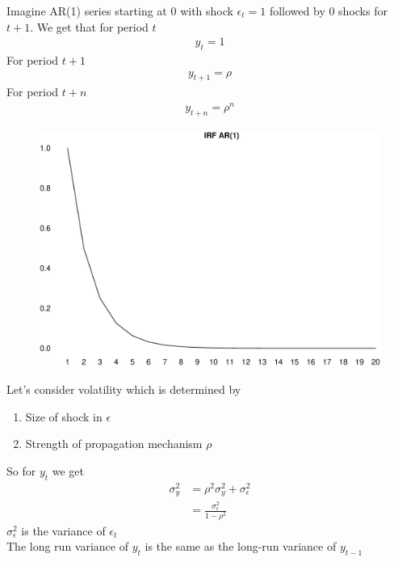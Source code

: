 \documentclass{beamer}
\begin{document}
\begin{frame}
  Imagine AR(1) series starting at 0 with shock $\epsilon_t = 1$ followed by 0 shocks for $t+1$.
  We get that for period $t$
  \begin{align}
    y_t = 1
  \end{align}
  \medskip
  For period $t+1$
  \begin{align}
    y_{t+1} = \rho
  \end{align}
  \medskip 
  For period $t+n$
  \begin{align}
    y_{t+n} = \rho^n
  \end{align}
\end{frame}

\begin{frame}
  \begin{figure}
    \includegraphics[scale=.3]{irf_ar1.eps}
  \end{figure}
\end{frame}


\begin{frame}
  Let's consider volatility which is determined by
  \begin{enumerate}
    \item Size of shock in $\epsilon$
    \item Strength of propagation mechanism $\rho$
  \end{enumerate}
  \medskip
  So for $y_t$ we get 
  \begin{align}
  \sigma_y^2 &= \rho^2 \sigma_y^2 + \sigma_\epsilon^2\\ \nonumber
  &= \frac{\sigma_\epsilon^2}{1-\rho^2}
\end{align}
\medskip
$\sigma_\epsilon^2$ is the variance of $\epsilon_t$\\
The long run variance of $y_t$ is the same as the long-run variance of $y_{t-1}$  
\end{frame}
\end{document}
